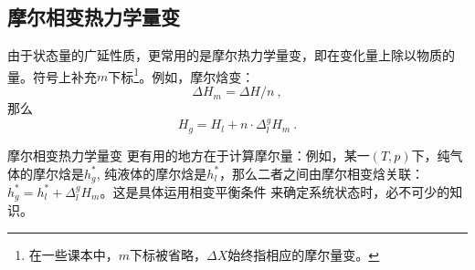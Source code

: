 \subsection{摩尔相变热力学量变}
由于状态量的广延性质，更常用的是摩尔热力学量变，即在变化量上除以物质的量。符号上补充$m$下标\footnote{在一些课本中，$m$下标被省略，$\Delta X$始终指相应的摩尔量变。}。例如，摩尔焓变：
$$
\Delta H_m = \Delta H / n~,
$$
那么
$$
H_g = H_l + n \cdot \Delta^g_l H_m~.
$$

摩尔相变热力学量变 更有用的地方在于计算摩尔量：例如，某一$(T,p)$下，纯气体的摩尔焓是$h^*_g$, 纯液体的摩尔焓是$h^*_l$，那么二者之间由摩尔相变焓关联：$h^*_g = h^*_l + \Delta^g_l H_m$。这是具体运用相变平衡条件 来确定系统状态时，必不可少的知识。

